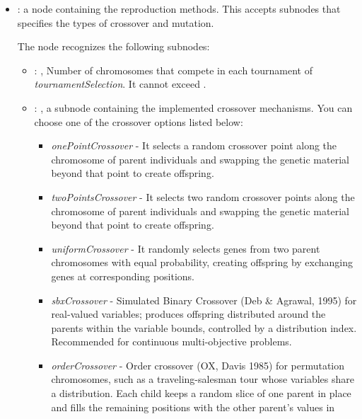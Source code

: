 \begin{itemize}
\begin{itemize}
        \item {}:
          a node containing the reproduction methods. This accepts subnodes that specifies the types
          of crossover and mutation.

          The  node recognizes the following subnodes:
          \begin{itemize}
            \item {}: ,
              Number of chromosomes that compete in each tournament of \textit{tournamentSelection}.
              It cannot         exceed . 

            \item {}: ,
              a subnode containing the implemented crossover mechanisms. You can choose one of the
              crossover options listed below:                   \begin{itemize}
              \item \textit{onePointCrossover} - It selects a random crossover point along the
              chromosome of parent individuals and swapping the genetic material beyond that point
              to create offspring.                     \item \textit{twoPointsCrossover} - It
              selects two random crossover points along the chromosome of parent individuals and
              swapping the genetic material beyond that point to create offspring.
              \item \textit{uniformCrossover} - It randomly selects genes from two parent
              chromosomes with equal probability, creating offspring by exchanging genes at
              corresponding positions.                     \item \textit{sbxCrossover} - Simulated
              Binary Crossover (Deb \& Agrawal, 1995) for real-valued variables; produces offspring
              distributed around the parents within the variable bounds, controlled by a
              distribution index. Recommended for continuous multi-objective problems.
              \item \textit{orderCrossover} - Order crossover (OX, Davis 1985) for permutation
              chromosomes, such as a traveling-salesman tour whose variables share a
               distribution. Each child keeps a random slice of one
              parent in place and fills the remaining positions with the other parent's values in

\end{itemize}
\end{itemize}
\end{itemize}
\end{itemize}
